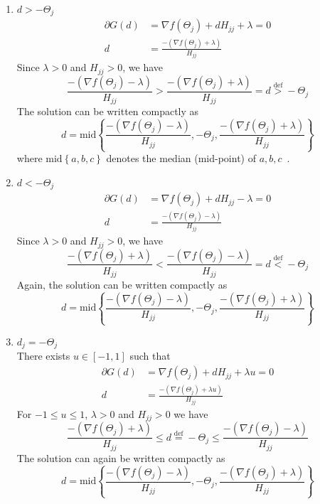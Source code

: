 \documentclass[12pt,letter]{article}\usepackage[]{graphicx}\usepackage[]{color}
\newcommand{\tm}[1]{\textrm{{#1}}}
\begin{document}
\begin{enumerate}
	\item $d > -\Theta_j$
	\begin{align}
		\partial G(d) & = \nabla f(\Theta_{j}) + d H_{j j} + \lambda = 0 \nonumber \\
		d & = \frac{-(\nabla f(\Theta_{j}) + \lambda)}{H_{j j}}  \nonumber
	\end{align}
	Since $\lambda>0$ and $H_{jj}>0$, we have
	\begin{equation*}
		\frac{-(\nabla f(\Theta_{j}) - \lambda)}{H_{j j}} > \frac{-(\nabla f(\Theta_{j}) + \lambda)}{H_{j j}} = d \overset{\tm{def}}{>} -\Theta_j
	\end{equation*}
	The solution can be written compactly as
	\begin{equation*}
		d = \tm{mid}\left\lbrace \frac{-(\nabla f(\Theta_{j}) - \lambda)}{H_{j j}}, -\Theta_j ,\frac{-(\nabla f(\Theta_{j}) + \lambda)}{H_{j j}} \right\rbrace
	\end{equation*}
	where $\tm{mid}\left\lbrace a,b,c \right\rbrace$ denotes the median (mid-point) of $a,b,c$~\citep{tseng2009coordinate}.
	\item $d < -\Theta_j$
	\begin{align}
		\partial G(d) & = \nabla f(\Theta_{j}) + d H_{j j} - \lambda = 0 \nonumber \\
		d & = \frac{-(\nabla f(\Theta_{j}) - \lambda)}{H_{j j}}  \nonumber
	\end{align}
	Since $\lambda>0$ and $H_{jj}>0$, we have
	\begin{equation*}
		\frac{-(\nabla f(\Theta_{j}) + \lambda)}{H_{j j}} < \frac{-(\nabla f(\Theta_{j}) - \lambda)}{H_{j j}} = d \overset{\tm{def}}{<} -\Theta_j
	\end{equation*}
	Again, the solution can be written compactly as
	\begin{equation*}
		d = \tm{mid}\left\lbrace \frac{-(\nabla f(\Theta_{j}) - \lambda)}{H_{j j}}, -\Theta_j ,\frac{-(\nabla f(\Theta_{j}) + \lambda)}{H_{j j}} \right\rbrace
	\end{equation*}
	
	\item $d_j = -\Theta_j$\\
	There exists $u \in [-1,1]$ such that
	\begin{align*}
		\partial G(d) & = \nabla f(\Theta_{j}) + d H_{j j} + \lambda u = 0 \nonumber \\
		d & = \frac{-(\nabla f(\Theta_{j}) + \lambda u)}{H_{j j}}  \nonumber
	\end{align*}
	For $-1 \leq u \leq 1$, $\lambda>0$ and $H_{jj}>0$ we have
	\begin{equation*}
		\frac{-(\nabla f(\Theta_{j}) + \lambda)}{H_{j j}} \leq  d \overset{\tm{def}}{=} -\Theta_j \leq \frac{-(\nabla f(\Theta_{j}) - \lambda)}{H_{j j}}
	\end{equation*}
	The solution can again be written compactly as
	\begin{equation*}
		d = \tm{mid}\left\lbrace \frac{-(\nabla f(\Theta_{j}) - \lambda)}{H_{j j}}, -\Theta_j ,\frac{-(\nabla f(\Theta_{j}) + \lambda)}{H_{j j}} \right\rbrace
	\end{equation*}
	
\end{enumerate}
\end{document}
